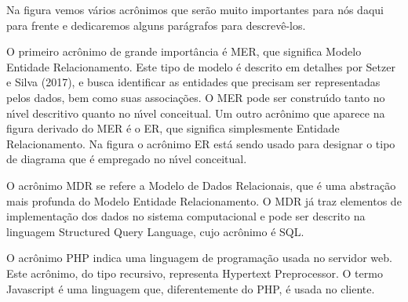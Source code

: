 \documentclass[
12pt,		%
openright,	%
twoside,  %
a4paper,			%
chapter=TITLE,		%
english,			%
french,				%
spanish,			%
brazil				%
]{USPSC-classe/USPSC}
\begin{document}
Na figura vemos v\'arios acr\^onimos que ser\~ao muito importantes para n\'os daqui para frente e dedicaremos alguns par\'agrafos para descrev\^e-los.










O primeiro acr\^onimo de grande import\^ancia \'e MER, que significa Modelo Entidade Relacionamento. Este tipo de modelo \'e descrito em detalhes por Setzer e Silva (2017), e busca identificar as entidades que precisam ser representadas pelos dados, bem como suas associa\c{c}\~oes. O MER pode ser constru\'{\i}do tanto no n\'{\i}vel descritivo quanto no n\'{\i}vel conceitual. Um outro acr\^onimo que aparece na figura derivado do MER \'e o ER, que significa simplesmente \textquotedbl Entidade Relacionamento\textquotedbl . Na figura o acr\^onimo ER est\'a sendo usado para designar o tipo de diagrama que \'e empregado no n\'{\i}vel conceitual.










O acr\^onimo MDR se refere a Modelo de Dados Relacionais, que \'e uma abstra\c{c}\~ao mais profunda do Modelo Entidade Relacionamento. O MDR j\'a traz elementos de implementa\c{c}\~ao dos dados no sistema computacional e pode ser descrito na linguagem Structured Query Language, cujo acr\^onimo \'e SQL.










O acr\^onimo PHP indica uma linguagem de programa\c{c}\~ao usada no servidor web. Este acr\^onimo, do tipo recursivo, representa Hypertext Preprocessor. O termo Javascript \'e uma linguagem que, diferentemente do PHP, \'e usada no cliente.
\end{document}
